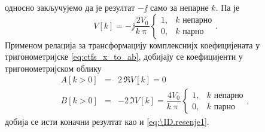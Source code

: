 односно закључујемо да је резултат $-\jj$ само за непарне $k$. Па је 
\begin{equation}
    V[k] = -\jj \dfrac{2V_0}{k\uppi} \begin{cases}
        1, & k\text{ непарно} \\
        0, & k\text{ парно}
    \end{cases}.
\end{equation}
Применом релација за трансформацију комплекснијх коефицијената у тригонометријске 
\ref{eq:ctfs_x_to_ab}, добијају се коефицијенти у тригонометријском облику 
\begin{eqnarray}
    A[k > 0] &=& 2\,\Re{V[k]} = 0 \\
    B[k > 0] &=& -2\,\Im{V[k]} = \dfrac{4V_0}{k\uppi}\begin{cases}
        1, & k\text{ непарно} \\
        0, & k\text{ парно}
    \end{cases},
\end{eqnarray}
добија се исти коначни резултат као и \ref{eq:\ID.resenje1}.